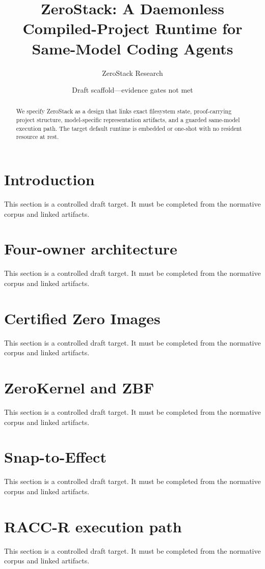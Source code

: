 \documentclass[11pt]{article}
\title{ZeroStack: A Daemonless Compiled-Project Runtime for Same-Model Coding Agents}
\author{ZeroStack Research}
\date{Draft scaffold---evidence gates not met}
\begin{document}
\maketitle
\begin{abstract}
We specify ZeroStack as a design that links exact filesystem state, proof-carrying project structure, model-specific representation artifacts, and a guarded same-model execution path. The target default runtime is embedded or one-shot with no resident resource at rest.
\end{abstract}
\tableofcontents
\section{Introduction}
This section is a controlled draft target. It must be completed from the normative corpus and linked artifacts.

\section{Four-owner architecture}
This section is a controlled draft target. It must be completed from the normative corpus and linked artifacts.

\section{Certified Zero Images}
This section is a controlled draft target. It must be completed from the normative corpus and linked artifacts.

\section{ZeroKernel and ZBF}
This section is a controlled draft target. It must be completed from the normative corpus and linked artifacts.

\section{Snap-to-Effect}
This section is a controlled draft target. It must be completed from the normative corpus and linked artifacts.

\section{RACC-R execution path}
This section is a controlled draft target. It must be completed from the normative corpus and linked artifacts.
\end{document}
